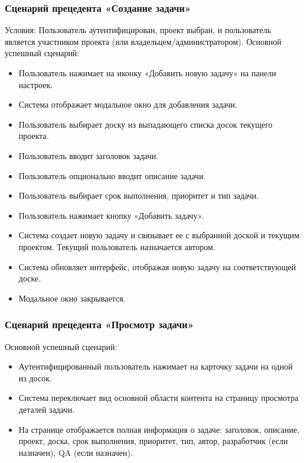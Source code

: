 \subsubsection{Сценарий прецедента «Создание  задачи»}
Условия: Пользователь аутентифицирован, проект выбран, и пользователь является участником проекта (или владельцем/администратором).
Основной успешный сценарий:
\begin{itemize}
	\item Пользователь нажимает на иконку «Добавить новую задачу» на панели настроек.
	\item Система отображает модальное окно для добавления задачи.
	\item Пользователь выбирает доску из выпадающего списка досок текущего проекта.
	\item Пользователь вводит заголовок задачи.
	\item Пользователь опционально вводит описание задачи.
	\item Пользователь выбирает срок выполнения, приоритет и тип задачи.
	\item Пользователь нажимает кнопку «Добавить задачу».
	\item Система создает новую задачу и связывает ее с выбранной доской и текущим проектом. Текущий пользователь назначается автором.
	\item Система обновляет интерфейс, отображая новую задачу на соответствующей доске.
	\item Модальное окно закрывается.
\end{itemize}

\subsubsection{Сценарий прецедента «Просмотр задачи»}
Основной успешный сценарий:
\begin{itemize}
	\item Аутентифицированный пользователь нажимает на карточку задачи на одной из досок.
	\item Система переключает вид основной области контента на страницу просмотра деталей задачи.
	\item На странице отображается полная информация о задаче: заголовок, описание, проект, доска, срок выполнения, приоритет, тип, автор, разработчик (если назначен), QA (если назначен).
\end{itemize}

